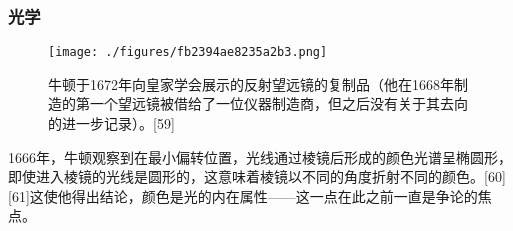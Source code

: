 \subsubsection{光学}
\begin{figure}[ht]
\centering
\texttt{[image: ./figures/fb2394ae8235a2b3.png]}
\caption{牛顿于1672年向皇家学会展示的反射望远镜的复制品（他在1668年制造的第一个望远镜被借给了一位仪器制造商，但之后没有关于其去向的进一步记录）。[59]} \label{fig_Newton_3}
\end{figure}
1666年，牛顿观察到在最小偏转位置，光线通过棱镜后形成的颜色光谱呈椭圆形，即使进入棱镜的光线是圆形的，这意味着棱镜以不同的角度折射不同的颜色。[60][61]这使他得出结论，颜色是光的内在属性——这一点在此之前一直是争论的焦点。